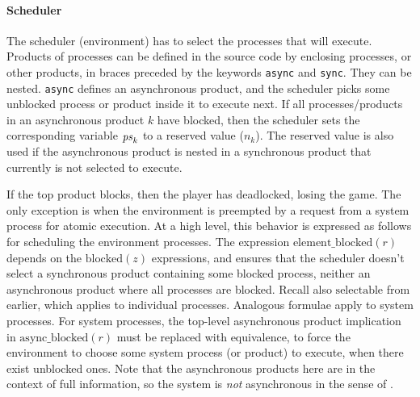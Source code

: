 \documentclass[copyright]{eptcs}
\begin{document}
\paragraph{Scheduler}

The scheduler (environment) has to select the processes that will execute.
Products of processes can be defined in the source code by enclosing processes, or other products, in braces preceded by the keywords \texttt{async} and \texttt{sync}.
They can be nested.
\texttt{async} defines an asynchronous product, and the scheduler picks some unblocked process or product inside it to execute next.
If all processes/products in an asynchronous product $k$ have blocked, then the scheduler sets the corresponding variable $\mathit{ps}_k$ to a reserved value ($n_k$).
The reserved value is also used if the asynchronous product is nested in a synchronous product that currently is not selected to execute.

If the top product blocks, then the player has deadlocked, losing the game.
The only exception is when the environment is preempted by a request from a system process for atomic execution.
At a high level, this behavior is expressed as follows for scheduling the environment processes.
The expression $\mathrm{element\_blocked}(r)$ depends on the $\mathrm{blocked}(z)$ expressions, and ensures that the scheduler doesn't select a synchronous product containing some blocked process, neither an asynchronous product where all processes are blocked.
Recall also $\mathrm{selectable}$ from earlier, which applies to individual processes.
Analogous formulae apply to system processes.
For system processes, the top-level asynchronous product implication in $\mathrm{async\_blocked}(r)$ must be replaced with equivalence, to force the environment to choose some system process (or product) to execute, when there exist unblocked ones.
Note that the asynchronous products here are in the context of full information, so the system is {\em not} asynchronous in the sense of \cite{Klein12vmcai,Pnueli09memocode}.
\end{document}
